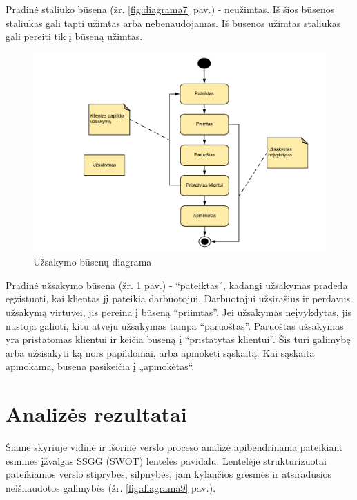 \documentclass{VUMIFPSkursinis}
\begin{document}
Pradinė  staliuko  būsena (žr. \ref{fig:diagrama7} pav.)  - neužimtas.  Iš  šios  būsenos  staliukas  gali  tapti  užimtas  arba nebenaudojamas. Iš būsenos užimtas staliukas gali pereiti tik į būseną užimtas. 



	\begin {figure}[H]
	\centering
		\caption{Užsakymo būsenų diagrama}
		\includegraphics[scale=0.9]{img/3lab/Diagrama8}
		
		\label{fig:diagrama8}
	\end{figure}

Pradinė užsakymo būsena (žr. \ref{fig:diagrama8} pav.) - “pateiktas”, kadangi užsakymas pradeda egzistuoti, kai klientas jį pateikia darbuotojui. Darbuotojui užsirašius ir perdavus užsakymą virtuvei, jis pereina į būseną “priimtas”. Jei užsakymas neįvykdytas, jis nustoja galioti, kitu atveju užsakymas  tampa “paruoštas”. Paruoštas užsakymas yra pristatomas klientui ir keičia būseną į “pristatytas klientui”. Šis turi galimybę arba užsisakyti ką nors papildomai, arba apmokėti sąskaitą. Kai sąskaita apmokama, būsena pasikeičia į „apmokėtas“.\\
\section{Analizės rezultatai}

Šiame skyriuje vidinė ir išorinė verslo proceso analizė apibendrinama pateikiant esmines įžvalgas SSGG (SWOT) lentelės pavidalu. Lentelėje struktūrizuotai pateikiamos verslo stiprybės, silpnybės, jam kylančios grėsmės ir atsiradusios neišnaudotos galimybės (žr. \ref{fig:diagrama9} pav.).
\end{document}
